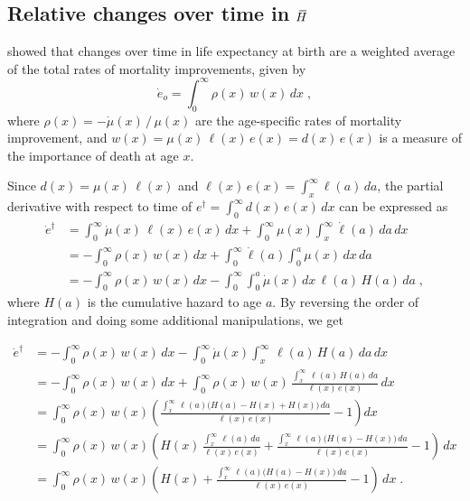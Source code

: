\documentclass[a4paper,twoside, openright, 12pt, leqno]{article}
\newcommand*\xbar[1]{%
   \hbox{%
     \vbox{%
       \hrule height 0.5pt %
       \kern0.3ex%
       \hbox{%
         \kern-0.28em%
         \ensuremath{#1}%
         \kern-0.05em%
       }%
     }%
   }%
}
\begin{document}
 
\subsection{Relative changes over time in $\,\xbar{H}$}

\cite{Vaupel2003} showed that changes over time in life expectancy at birth are a weighted average of the total rates of mortality improvements, given by
%
\begin{equation}
\label{ex.derivative}
\dot{e}_o=\int_0^\infty\rho(x)\,w(x)\,dx\;,
\end{equation}
where $\rho(x)=-\dot{\mu}(x)\,/\,\mu(x)$ are the age-specific rates of mortality improvement, and $w(x)=\mu(x)\,\ell(x)\,e(x) = d(x)\,e(x)$ is a measure of the importance of death at age $x$. 

Since $d(x)=\mu(x)\,\ell(x)$ and $\ell(x)\,e(x)=\int_x^\infty\ell(a)\,da$, the partial derivative with respect to time of $e^\dagger=\int_0^\infty d(x)\,e(x)\,dx$ can be expressed as
%
\begin{equation*}
 \begin{split}
 \dot{e}^\dagger	& = \int_0^\infty\dot{\mu}(x)\,\ell(x)\,e(x)\,dx+\int_0^\infty\mu(x)\int_x^\infty\dot{\ell}(a)\,da\,dx		\\
			& = -\int_0^\infty\rho(x)\,w(x)\,dx+\int_0^\infty\dot{\ell}(a)\int_0^a\mu(x)\,dx\,da                         \\
			& = -\int_0^\infty\rho(x)\,w(x)\,dx-\int_0^\infty\int_0^a\dot{\mu}(x)\,dx\,\ell(a)\,H(a)\,da\;,
 \end{split}
\end{equation*}
%
where $H(a)$ is the cumulative hazard to age $a$. By reversing the order of integration and doing some additional manipulations, we get

\begin{equation}
 \begin{split}
 \dot{e}^\dagger	
    & = -\int_0^\infty\rho(x)\,w(x)\,dx-\int_0^\infty\dot{\mu}(x)\int_x^\infty\,\ell(a)\,H(a)\,da\,dx    \\
    & = -\int_0^\infty\rho(x)\,w(x)\,dx+\int_0^\infty\rho(x)\,w(x)\,\frac{\int_x^\infty\,\ell(a)\,H(a)\,da}{\ell(x)\,e(x)}\,dx                                   \\
    & =\int_0^\infty\rho(x)\,w(x)\left(\frac{\int_x^\infty\,\ell(a)\big(H(a)-H(x)+H(x)\big)\,da}{\ell(x)\,e(x)}-1\right)dx                  \\
    & =\int_0^\infty\rho(x)\,w(x)\left(H(x)\,\frac{\int_x^\infty\,\ell(a)\,da}{\ell(x)\,e(x)}+\frac{\int_x^\infty\,\ell(a)\big(H(a)-H(x)\big)\,da}{\ell(x)\,e(x)}-1\right)\,dx                                           \\
    & =\int_0^\infty\rho(x)\,w(x)\left(H(x)+\frac{\int_x^\infty\,\ell(a)\big(H(a)-H(x)\big)\,da}{\ell(x)\,e(x)}-1\right)\,dx\;.
 \label{der.edagger}
 \end{split}
\end{equation}
\end{document}
